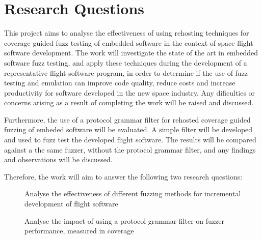 \documentclass[../report.tex]{subfiles}
\begin{document}



\section{Research Questions} \label{sec:rq}
This project aims to analyse the effectiveness of using rehosting techniques
for coverage guided fuzz testing of embedded software in the context of space
flight software development. The work will investigate the state of the art in
embedded software fuzz testing, and apply these techniques during the
development of a representative flight software program, in order to determine
if the use of fuzz testing and emulation can improve code quality, reduce costs
and increase productivity for software developed in the new space industry. Any
dificulties or concerns arising as a result of completing the work will be
raised and discussed.

Furthermore, the use of a protocol grammar filter for rehosted coverage guided
fuzzing of embeded software will be evaluated. A simple filter will be
developed and used to fuzz test the developed flight software. The results will
be compared against a the same fuzzer, without the protocol grammar filter, and
any findings and observations will be discussed.

Therefore, the work will aim to answer the following two research questions:

\begin{description}
    \item[]Analyse the effectiveness of different fuzzing methods for incremental development of flight software
    \item[]Analyse the impact of using a protocol grammar filter on fuzzer performance, measured in coverage

\end{description}
\end{document}
